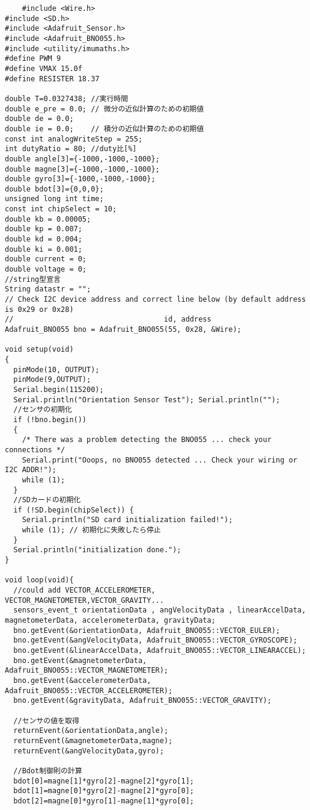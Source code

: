 \begin{lstlisting}
    #include <Wire.h>
#include <SD.h>
#include <Adafruit_Sensor.h>
#include <Adafruit_BNO055.h>
#include <utility/imumaths.h>
#define PWM 9
#define VMAX 15.0f
#define RESISTER 18.37

double T=0.0327438; //実行時間
double e_pre = 0.0; // 微分の近似計算のための初期値
double de = 0.0; 
double ie = 0.0;    // 積分の近似計算のための初期値
const int analogWriteStep = 255;
int dutyRatio = 80; //duty比[%]
double angle[3]={-1000,-1000,-1000};
double magne[3]={-1000,-1000,-1000};
double gyro[3]={-1000,-1000,-1000};
double bdot[3]={0,0,0};
unsigned long int time;
const int chipSelect = 10;
double kb = 0.00005;
double kp = 0.007;
double kd = 0.004;
double ki = 0.001;
double current = 0;
double voltage = 0;
//string型宣言
String datastr = "";
// Check I2C device address and correct line below (by default address is 0x29 or 0x28)
//                                   id, address
Adafruit_BNO055 bno = Adafruit_BNO055(55, 0x28, &Wire);

void setup(void)
{
  pinMode(10, OUTPUT);
  pinMode(9,OUTPUT);
  Serial.begin(115200);
  Serial.println("Orientation Sensor Test"); Serial.println("");
  //センサの初期化
  if (!bno.begin())
  {
    /* There was a problem detecting the BNO055 ... check your connections */
    Serial.print("Ooops, no BNO055 detected ... Check your wiring or I2C ADDR!");
    while (1);
  }
  //SDカードの初期化
  if (!SD.begin(chipSelect)) {
    Serial.println("SD card initialization failed!");
    while (1); // 初期化に失敗したら停止
  }
  Serial.println("initialization done.");
}

void loop(void){
  //could add VECTOR_ACCELEROMETER, VECTOR_MAGNETOMETER,VECTOR_GRAVITY...
  sensors_event_t orientationData , angVelocityData , linearAccelData, magnetometerData, accelerometerData, gravityData;
  bno.getEvent(&orientationData, Adafruit_BNO055::VECTOR_EULER);
  bno.getEvent(&angVelocityData, Adafruit_BNO055::VECTOR_GYROSCOPE);
  bno.getEvent(&linearAccelData, Adafruit_BNO055::VECTOR_LINEARACCEL);
  bno.getEvent(&magnetometerData, Adafruit_BNO055::VECTOR_MAGNETOMETER);
  bno.getEvent(&accelerometerData, Adafruit_BNO055::VECTOR_ACCELEROMETER);
  bno.getEvent(&gravityData, Adafruit_BNO055::VECTOR_GRAVITY);

  //センサの値を取得
  returnEvent(&orientationData,angle);
  returnEvent(&magnetometerData,magne);
  returnEvent(&angVelocityData,gyro);

  //Bdot制御則の計算
  bdot[0]=magne[1]*gyro[2]-magne[2]*gyro[1];
  bdot[1]=magne[0]*gyro[2]-magne[2]*gyro[0];
  bdot[2]=magne[0]*gyro[1]-magne[1]*gyro[0];


\end{lstlisting}
